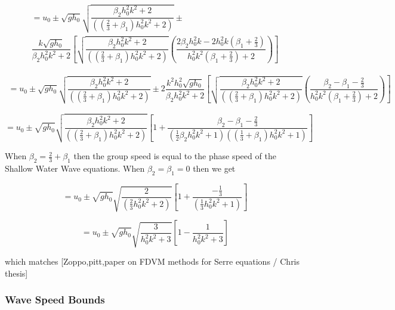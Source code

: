 \documentclass[10pt]{article}
\begin{document}
\begin{multline*}
= u_0  \pm  \sqrt{gh_0} \sqrt{\dfrac{\beta_2 h_0^2 k^2 + 2}{\left( \left(\frac{2}{3} + \beta_1\right) h_0^2 k^2 + 2\right)} } \pm \\ \dfrac{k\sqrt{gh_0}}{\beta_2 h_0^2 k^2 +2} \left[\sqrt{\dfrac{\beta_2 h_0^2 k^2 + 2}{\left( \left(\frac{2}{3} + \beta_1\right) h_0^2 k^2 + 2\right)} } \left(  \dfrac{  2\beta_2 h_0^2 k  -    2 h_0^2 k \left(\beta_1 + \frac{2}{3}\right)}{h_0^2 k^2 \left(\beta_1 + \frac{2}{3}\right) + 2} \right)\right]
\end{multline*} 

\begin{multline*}
= u_0  \pm  \sqrt{gh_0} \sqrt{\dfrac{\beta_2 h_0^2 k^2 + 2}{\left( \left(\frac{2}{3} + \beta_1\right) h_0^2 k^2 + 2\right)} } \pm  2\dfrac{k^2h_0^2\sqrt{gh_0}}{\beta_2 h_0^2 k^2 +2} \left[\sqrt{\dfrac{\beta_2 h_0^2 k^2 + 2}{\left( \left(\frac{2}{3} + \beta_1\right) h_0^2 k^2 + 2\right)} } \left(  \dfrac{\beta_2  -    \beta_1 - \frac{2}{3}}{h_0^2 k^2 \left(\beta_1 + \frac{2}{3}\right) + 2} \right)\right]
\end{multline*} 

\begin{equation*}
= u_0  \pm  \sqrt{gh_0} \sqrt{\dfrac{\beta_2 h_0^2 k^2 + 2}{\left( \left(\frac{2}{3} + \beta_1\right) h_0^2 k^2 + 2\right)} } \left[1 +  \dfrac{\beta_2 - \beta_1 - \frac{2}{3}}{\left(\frac{1}{2}\beta_2 h_0^2 k^2 +1\right)\left( \left(\frac{1}{3} + \beta_1\right) h_0^2 k^2 + 1\right)}\right] 
\end{equation*} 


When $\beta_2 = \frac{2}{3} + \beta_1$ then the group speed is equal to the phase speed of the Shallow Water Wave equations. When $\beta_2 = \beta_1 = 0$ then we get

\begin{equation*}
= u_0  \pm  \sqrt{gh_0} \sqrt{\dfrac{2}{\left( \frac{2}{3} h_0^2 k^2 + 2\right)} } \left[1 + \dfrac{- \frac{1}{3}}{\left( \frac{1}{3} h_0^2 k^2 + 1\right)}\right] 
\end{equation*} 

\begin{equation*}
= u_0  \pm  \sqrt{gh_0} \sqrt{\dfrac{3}{  h_0^2 k^2 + 3} } \left[1 -  \dfrac{1}{ h_0^2 k^2 + 3}\right] 
\end{equation*} 

which matches [Zoppo,pitt,paper on FDVM methods for Serre equations / Chris thesis]


\subsubsection{Wave Speed Bounds}
\end{document}
